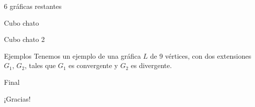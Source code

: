 \documentclass[spanish,mexico]{beamer}
\begin{document}
\begin{frame}[label=sec-30]{6 gráficas restantes}

\end{frame}
\begin{frame}[label=sec-31]{Cubo chato}

\end{frame}
\begin{frame}[label=sec-32]{Cubo chato 2}

\end{frame}
\begin{frame}[label=sec-33]{Ejemplos}
Tenemos un ejemplo de una gráfica \(L\) de 9 vértices, con dos
extensiones \(G_{1}\), \(G_{2}\), tales que \(G_{1}\) es convergente
y \(G_{2}\) es divergente. 
\end{frame}
\begin{frame}[label=sec-34]{Final}
\begin{center}
\begin{huge}
¡Gracias!
\end{huge}
\end{center}
\end{frame}
\end{document}
